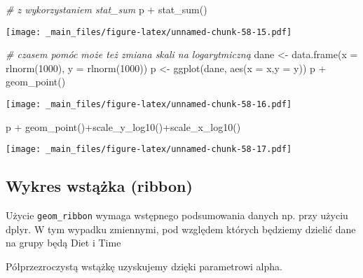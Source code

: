 \documentclass[
]{book}
\newenvironment{Shaded}{\begin{snugshade}}{\end{snugshade}}
\newcommand{\AttributeTok}[1]{\textcolor[rgb]{0.77,0.63,0.00}{#1}}
\newcommand{\CommentTok}[1]{\textcolor[rgb]{0.56,0.35,0.01}{\textit{#1}}}
\newcommand{\DecValTok}[1]{\textcolor[rgb]{0.00,0.00,0.81}{#1}}
\newcommand{\FunctionTok}[1]{\textcolor[rgb]{0.00,0.00,0.00}{#1}}
\newcommand{\NormalTok}[1]{#1}
\newcommand{\OtherTok}[1]{\textcolor[rgb]{0.56,0.35,0.01}{#1}}
\newcommand{\SpecialCharTok}[1]{\textcolor[rgb]{0.00,0.00,0.00}{#1}}
\begin{document}
\begin{Shaded}
\begin{Highlighting}[]
\CommentTok{\# z wykorzystaniem stat\_sum}
\NormalTok{p }\SpecialCharTok{+} \FunctionTok{stat\_sum}\NormalTok{()}
\end{Highlighting}
\end{Shaded}

\texttt{[image: \_main\_files/figure-latex/unnamed-chunk-58-15.pdf]}

\begin{Shaded}
\begin{Highlighting}[]
\CommentTok{\# czasem pomóc może też zmiana skali na logarytmiczną}
\NormalTok{dane }\OtherTok{\textless{}{-}} \FunctionTok{data.frame}\NormalTok{(}\AttributeTok{x =} \FunctionTok{rlnorm}\NormalTok{(}\DecValTok{1000}\NormalTok{), }\AttributeTok{y =} \FunctionTok{rlnorm}\NormalTok{(}\DecValTok{1000}\NormalTok{))}
\NormalTok{p }\OtherTok{\textless{}{-}} \FunctionTok{ggplot}\NormalTok{(dane, }\FunctionTok{aes}\NormalTok{(}\AttributeTok{x =}\NormalTok{ x,}\AttributeTok{y =}\NormalTok{ y))}
\NormalTok{p }\SpecialCharTok{+} \FunctionTok{geom\_point}\NormalTok{()}
\end{Highlighting}
\end{Shaded}

\texttt{[image: \_main\_files/figure-latex/unnamed-chunk-58-16.pdf]}

\begin{Shaded}
\begin{Highlighting}[]
\NormalTok{p }\SpecialCharTok{+} \FunctionTok{geom\_point}\NormalTok{()}\SpecialCharTok{+}\FunctionTok{scale\_y\_log10}\NormalTok{()}\SpecialCharTok{+}\FunctionTok{scale\_x\_log10}\NormalTok{()}
\end{Highlighting}
\end{Shaded}

\texttt{[image: \_main\_files/figure-latex/unnamed-chunk-58-17.pdf]}

\hypertarget{wykres-wstux105ux17cka-ribbon}{%
\subsection{Wykres wstążka (ribbon)}\label{wykres-wstux105ux17cka-ribbon}}

Użycie \texttt{geom\_ribbon} wymaga wstępnego podsumowania danych np. przy użyciu dplyr. W tym wypadku zmiennymi, pod względem których będziemy dzielić dane na grupy będą Diet i Time

Półprzezroczystą wstążkę uzyskujemy dzięki parametrowi alpha.
\end{document}
